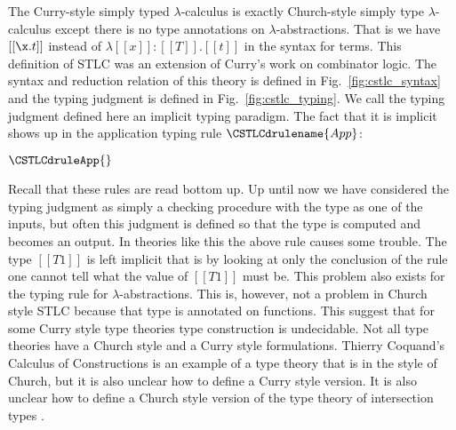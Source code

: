 The Curry-style simply typed $\lambda$-calculus is exactly
Church-style simply type $\lambda$-calculus except there is no type
annotations on $\lambda$-abstractions.  That is we have $[[\x.t]]$
instead of $\lambda [[x]]:[[T]].[[t]]$ in the syntax for terms.  This
definition of STLC was an extension of Curry's work on combinator
logic. The syntax and reduction relation of this theory is defined in
Fig.~\ref{fig:cstlc_syntax} and the typing judgment is defined in
Fig.~\ref{fig:cstlc_typing}. We call the typing judgment defined
here an implicit typing paradigm.  The fact that it is implicit shows
up in the application typing rule $\CSTLCdrulename{App}$:
\begin{center}
  \begin{math}
    \CSTLCdruleApp{}
  \end{math}
\end{center}
Recall that these rules are read bottom up.  Up until now we have
considered the typing judgment as simply a checking procedure with the
type as one of the inputs, but often this judgment is defined so that
the type is computed and becomes an output.  In theories like this the
above rule causes some trouble.  The type $[[T1]]$ is left implicit
that is by looking at only the conclusion of the rule one cannot tell
what the value of $[[T1]]$ must be.  This problem also exists for the
typing rule for $\lambda$-abstractions.  This is, however, not a
problem in Church style STLC because that type is annotated on
functions.  This suggest that for some Curry style type theories type
construction is undecidable.  Not all type theories have a Church
style and a Curry style formulations.  Thierry Coquand's Calculus of
Constructions is an example of a type theory that is in the style of
Church, but it is also unclear how to define a Curry style version.
It is also unclear how to define a Church style version of the type
theory of intersection types \cite{Barendregt:1992}.

